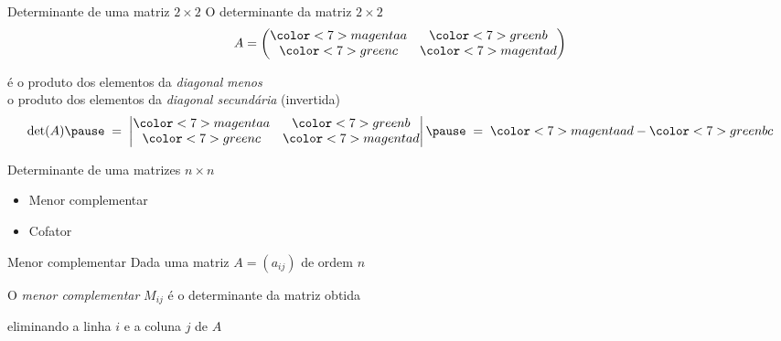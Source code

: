 \documentclass[fleqn,aspectratio=169,12pt]{beamer}
\begin{document}
\begin{frame}{Determinante de uma matriz $2\times 2$}
  O determinante da matriz $2\times 2$
  \[
    A =
    \begin{pmatrix}
      {\color<7>{magenta} a} & {\color<7>{green} b}   \\
      {\color<7>{green} c}   & {\color<7>{magenta} d}
    \end{pmatrix}
  \]

  \pause
  é o produto dos elementos da \emph{diagonal}
  \pause
  \emph{menos}
  \\ \pause
  o produto dos elementos da \emph{diagonal secundária} (invertida)
  \pause
  \[
    \det(A)
    \pause
    \;=\;
    \begin{vmatrix}
      {\color<7>{magenta} a} & {\color<7>{green} b}   \\
      {\color<7>{green} c}   & {\color<7>{magenta} d}
    \end{vmatrix}
    \pause
    \;=\;
    {\color<7>{magenta}ad} - {\color<7>{green}bc}
  \]

\end{frame}



\begin{frame}{Determinante de uma matrizes $n\times n$}

  \begin{itemize}[<+->]
  \item Menor complementar
  \item Cofator
  \end{itemize}
\end{frame}

\begin{frame}{Menor complementar}
  Dada uma matriz $A=(a_{ij})$ de ordem $n$

  \pause
  O \emph{menor complementar} $M_{ij}$
  \pause
  é o determinante da matriz obtida

  \pause
  eliminando a linha $i$ e a coluna $j$ de $A$
\end{frame}
\end{document}
